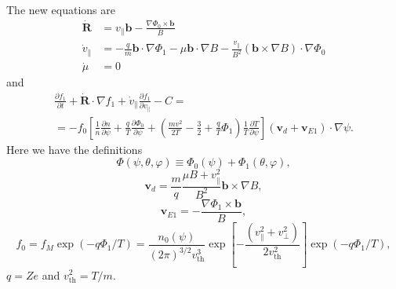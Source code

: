 \documentclass[12pt]{article}
\newcommand{\p}{\partial}
\newcommand{\na}{\nabla}
\begin{document}
The new equations are
\begin{align}
\dot{\bm{R}} & =  v_\| \bm{b} - \frac{\na \Phi_0 \times \bm{b}}{B}  \\
\dot{v}_\| & =  - \frac{q}{m} \bm{b} \cdot \na \Phi_1 - \mu \bm{b} \cdot \na B - \frac{v_\|}{B^2} \left(\bm{b} \times \na B\right) \cdot \na \Phi_0 \\
\dot{\mu} & =  0
\label{eq:ParticleTrajEuterpeNew}
\end{align}
and
\begin{multline}
\frac{\p f_1}{\p t} + \dot{\bm{R}} \cdot \na f_1 + \dot{v}_\| \frac{\p f_1}{\p v_\|} - C = \\ =
- f_0 \left[\frac{1}{n} \frac{\p n}{\p \psi} + \frac{q}{T} \frac{\p \Phi_0}{\p \psi} + \left(\frac{m v^2}{2 T} - \frac{3}{2} + \frac{q}{T} \Phi_1\right) \frac{1}{T} \frac{\p T}{\p \psi}\right] 
\left(\bm{v}_d + \bm{v}_{E1}\right) \cdot \na \psi.
\label{eq:DriftKineticEuterpeNew}
\end{multline}
Here we have the definitions
\begin{equation}
\Phi\left(\psi, \theta, \varphi\right) \equiv \Phi_0\left(\psi\right) + \Phi_1\left(\theta, \varphi\right),
\label{eq:Phi}
\end{equation}
\begin{equation}
\bm{v}_d = \frac{m}{q} \frac{\mu B + v_\|^2}{B^2} \bm{b} \times \na B,
\label{eq:MagneticDrift}
\end{equation}
\begin{equation}
\bm{v}_{E1} = - \frac{\na \Phi_1 \times \bm{b}}{B},
\label{eq:ElectricDrift1}
\end{equation}
\begin{equation}
f_0 = f_M \exp \left(- q \Phi_1 / T \right) = \frac{n_0\left(\psi\right)}{\left(2 \pi\right)^{3/2} v_{\mathrm{th}}^3} \exp \left[- \frac{\left(v_\|^2  + v_\perp^2\right)}{2 v_{\mathrm{th}}^2}\right] \exp \left(- q \Phi_1 / T \right),
\label{eq:f0}
\end{equation}
$q = Z e$ and $v_{\mathrm{th}}^2 = T/m$.\\
\end{document}
